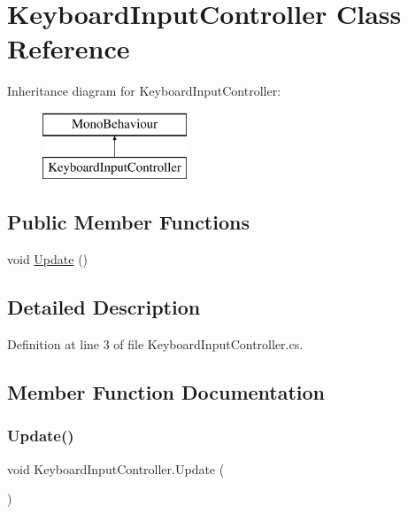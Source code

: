 \hypertarget{class_keyboard_input_controller}{}\section{Keyboard\+Input\+Controller Class Reference}
\label{class_keyboard_input_controller}
Inheritance diagram for Keyboard\+Input\+Controller\+:\begin{figure}[H]
\begin{center}
\leavevmode
\includegraphics[height=2.000000cm]{class_keyboard_input_controller}
\end{center}
\end{figure}
\subsection*{Public Member Functions}
\begin{DoxyCompactItemize}
\item 
void \mbox{\hyperlink{class_keyboard_input_controller_a935a37d33af1ca6bfc104f6dcabaf392}{Update}} ()
\end{DoxyCompactItemize}


\subsection{Detailed Description}


Definition at line 3 of file Keyboard\+Input\+Controller.\+cs.



\subsection{Member Function Documentation}
\mbox{\label{class_keyboard_input_controller_a935a37d33af1ca6bfc104f6dcabaf392}} 
\subsubsection{\texorpdfstring{Update()}{Update()}}
{\footnotesize\ttfamily void Keyboard\+Input\+Controller.\+Update (\begin{DoxyParamCaption}{ }\end{DoxyParamCaption})}



